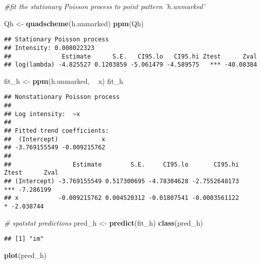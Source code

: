 \documentclass[]{article}
\newenvironment{Shaded}{\begin{snugshade}}{\end{snugshade}}
\newcommand{\CommentTok}[1]{\textcolor[rgb]{0.56,0.35,0.01}{\textit{#1}}}
\newcommand{\KeywordTok}[1]{\textcolor[rgb]{0.13,0.29,0.53}{\textbf{#1}}}
\newcommand{\NormalTok}[1]{#1}
\newcommand{\OperatorTok}[1]{\textcolor[rgb]{0.81,0.36,0.00}{\textbf{#1}}}
\newcommand{\StringTok}[1]{\textcolor[rgb]{0.31,0.60,0.02}{#1}}
\begin{document}
\begin{Shaded}
\begin{Highlighting}[]
 \CommentTok{#fit the stationary Poisson process to point pattern 'h.unmarked'}

\NormalTok{ Qh <-}\StringTok{ }\KeywordTok{quadscheme}\NormalTok{(h.unmarked) }
 \KeywordTok{ppm}\NormalTok{(Qh) }
\end{Highlighting}
\end{Shaded}

\begin{verbatim}
## Stationary Poisson process
## Intensity: 0.008022323
##              Estimate      S.E.   CI95.lo   CI95.hi Ztest      Zval
## log(lambda) -4.825527 0.1203859 -5.061479 -4.589575   *** -40.08384
\end{verbatim}

\begin{Shaded}
\begin{Highlighting}[]
\NormalTok{fit_h <-}\StringTok{ }\KeywordTok{ppm}\NormalTok{(h.unmarked, }\OperatorTok{~}\StringTok{ }\NormalTok{x)}
\NormalTok{fit_h}
\end{Highlighting}
\end{Shaded}

\begin{verbatim}
## Nonstationary Poisson process
## 
## Log intensity:  ~x
## 
## Fitted trend coefficients:
##  (Intercept)            x 
## -3.769155549 -0.009215762 
## 
##                 Estimate        S.E.     CI95.lo       CI95.hi Ztest      Zval
## (Intercept) -3.769155549 0.517300695 -4.78304628 -2.7552648173   *** -7.286199
## x           -0.009215762 0.004520312 -0.01807541 -0.0003561122     * -2.038744
\end{verbatim}

\begin{Shaded}
\begin{Highlighting}[]
\CommentTok{# spatstat predictions}
\NormalTok{pred_h <-}\StringTok{ }\KeywordTok{predict}\NormalTok{(fit_h)}
\KeywordTok{class}\NormalTok{(pred_h)}
\end{Highlighting}
\end{Shaded}

\begin{verbatim}
## [1] "im"
\end{verbatim}

\begin{Shaded}
\begin{Highlighting}[]
\KeywordTok{plot}\NormalTok{(pred_h)}
\end{Highlighting}
\end{Shaded}
\end{document}
